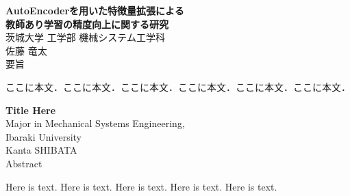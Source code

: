 \begin{center}
  \textbf{{\LARGE AutoEncoderを用いた特徴量拡張による\\教師あり学習の精度向上に関する研究\\}}
  \vspace{5mm}
  {\large 茨城大学 工学部 機械システム工学科\\
  佐藤 竜太\\}
  \vspace{5mm}
  {\large 要旨}
  \vspace{5mm}
\end{center}
ここに本文．ここに本文．ここに本文．ここに本文．ここに本文．ここに本文．

\newpage

\begin{center}
  \textbf{{\LARGE Title Here\\}}
  \vspace{5mm}
  {\large Major in Mechanical Systems Engineering,\\ Ibaraki University\\
  Kanta SHIBATA\\}
  \vspace{5mm}
  {\large Abstract}
  \vspace{5mm}
\end{center}
Here is text. Here is text. Here is text. Here is text. Here is text.
